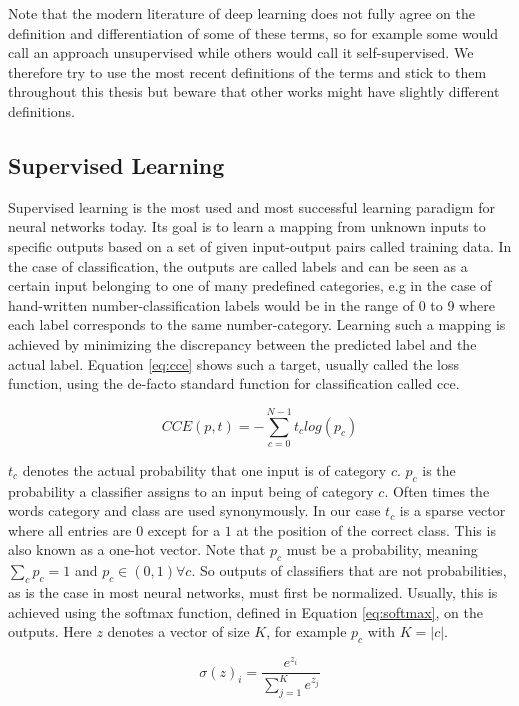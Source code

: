 Note that the modern literature of deep learning does not fully agree on the definition and differentiation of some of these terms, so for example some would call an approach unsupervised while others would call it self-supervised. We therefore try to use the most recent definitions of the terms and stick to them throughout this thesis but beware that other works might have slightly different definitions.

\subsection{Supervised Learning}\label{subsec:supervised}

Supervised learning is the most used and most successful learning paradigm for neural networks today. Its goal is to learn a mapping from unknown inputs to specific outputs based on a set of given input-output pairs called training data. In the case of classification, the outputs are called labels and can be seen as a certain input belonging to one of many predefined categories, e.g in the case of hand-written number-classification labels would be in the range of 0 to 9 where each label corresponds to the same number-category. Learning such a mapping is achieved by minimizing the discrepancy between the predicted label and the actual label. Equation \ref{eq:cce} shows such a target, usually called the loss function, using the de-facto standard function for classification called \gls{cce}.

\begin{equation}
    \label{eq:cce}
    CCE(p,t) = - \sum_{c=0}^{N-1} t_{c} log(p_{c})
\end{equation}

$t_{c}$ denotes the actual probability that one input is of category $c$. $p_{c}$ is the probability a classifier assigns to an input being of category $c$. Often times the words category and class are used synonymously. In our case $t_{c}$ is a sparse vector where all entries are $0$ except for a $1$ at the position of the correct class. This is also known as a one-hot vector. Note that $p_{c}$ must be a probability, meaning $\sum_c p_{c} = 1$ and $p_{c} \in (0,1) \forall c$. So outputs of classifiers that are not probabilities, as is the case in most neural networks, must first be normalized. Usually, this is achieved using the softmax function, defined in Equation \ref{eq:softmax}, on the outputs. Here $z$ denotes a vector of size $K$, for example $p_{c}$ with $K = |c|$.

\begin{equation}
    \label{eq:softmax}
    \sigma(z)_i = \frac{e^{z_i}}{\sum_{j=1}^K e^{z_j}}
\end{equation}

